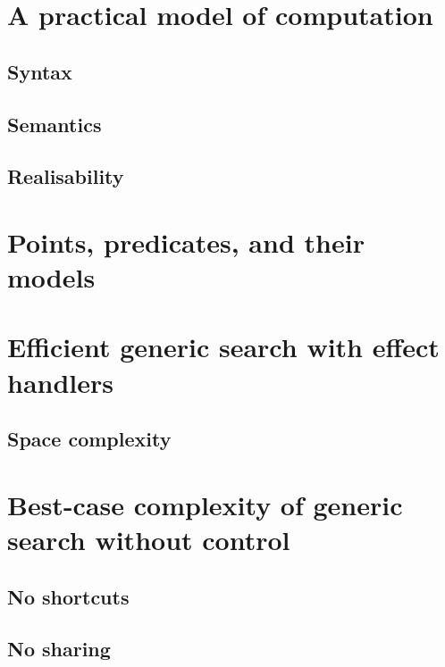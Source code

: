 \documentclass[12pt,phd,lfcs,twoside,openright,logo,leftchapter,normalheadings]{infthesis}
\theoremstyle{plain}
\theoremstyle{definition}
\begin{document}
\section{A practical model of computation}
\subsection{Syntax}
\subsection{Semantics}
\subsection{Realisability}
\section{Points, predicates, and their models}
\section{Efficient generic search with effect handlers}
\subsection{Space complexity}
\section{Best-case complexity of generic search without control}
\subsection{No shortcuts}
\subsection{No sharing}

\end{document}
